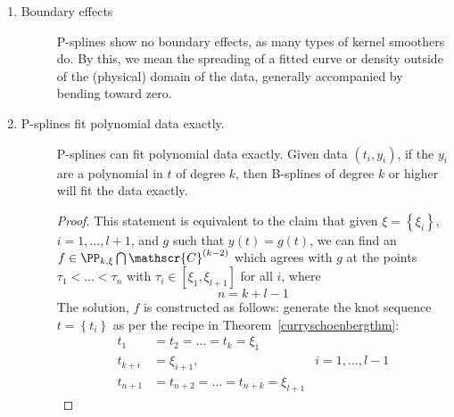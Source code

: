 \documentclass[12pt]{article}
\begin{document}
\begin{enumerate} \label{eq:PS_properties}
\item \begin{description}\item[Boundary effects]
 P-splines show no boundary effects, as many types of kernel smoothers do. By this, we mean the spreading of a fitted curve or density outside of the (physical) domain of the data, generally accompanied by bending toward zero.
\end{description}
\item \begin{description}\item[P-splines fit polynomial data exactly.] 
P-splines can fit polynomial data exactly. Given data $\left(t_i,y_i\right)$, if the $y_i$ are a polynomial in $t$ of degree $k$, then B-splines of degree $k$ or higher will fit the data exactly. 
\begin{proof}
This statement is equivalent to the claim that given $\xi = \left\{ \xi_i \right\}$, $i=1,\dots,l+1$, and $g$ such that $y\left(t\right) = g\left(t\right)$, we can find an $f \in \PP_{k,\xi} \bigcap \mathscr{C}^{\left(k-2\right)}$ which agrees with $g$ at the points $\tau_1 < \dots < \tau_n$  with $\tau_i \in \left[\xi_1,\xi_{l+1}\right]$ for all $i$, where
\[
n=k+l-1
\]
The solution, $f$ is constructed as follows: generate the knot sequence $t = \left\{t_i\right\}$ as per the recipe in Theorem~\ref{curryschoenbergthm}:
\begin{align*}
t_1 &= t_2 = \dots = t_k = \xi_1 & \\
t_{k+i} &= \xi_{i+1}, & i=1,\dots,l-1\\
t_{n+1} &= t_{n+2} = \dots = t_{n+k} = \xi_{l+1} & 
\end{align*}


\end{proof}
\end{description}
\end{enumerate}
\end{document}
